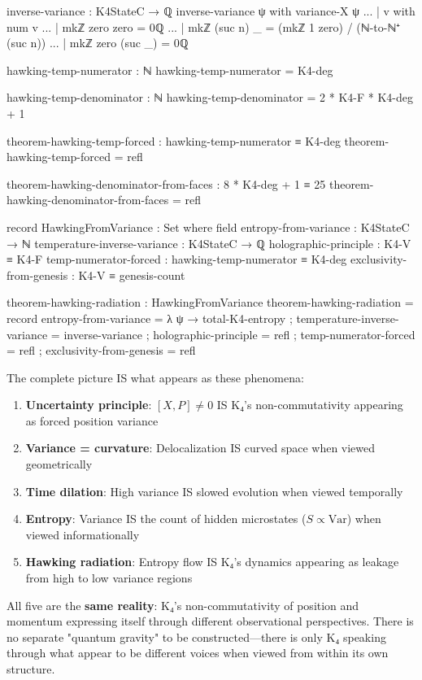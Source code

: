 \documentclass[11pt,a4paper]{book}
\begin{document}
\begin{code}
inverse-variance : K4StateC → ℚ
inverse-variance ψ with variance-X ψ
... | v with num v
...   | mkℤ zero zero = 0ℚ
...   | mkℤ (suc n) _ = (mkℤ 1 zero) / (ℕ-to-ℕ⁺ (suc n))
...   | mkℤ zero (suc _) = 0ℚ

hawking-temp-numerator : ℕ
hawking-temp-numerator = K4-deg

hawking-temp-denominator : ℕ
hawking-temp-denominator = 2 * K4-F * K4-deg + 1

theorem-hawking-temp-forced : hawking-temp-numerator ≡ K4-deg
theorem-hawking-temp-forced = refl

theorem-hawking-denominator-from-faces : 8 * K4-deg + 1 ≡ 25
theorem-hawking-denominator-from-faces = refl

record HawkingFromVariance : Set where
  field
    entropy-from-variance : K4StateC → ℕ
    temperature-inverse-variance : K4StateC → ℚ
    holographic-principle : K4-V ≡ K4-F
    temp-numerator-forced : hawking-temp-numerator ≡ K4-deg
    exclusivity-from-genesis : K4-V ≡ genesis-count

theorem-hawking-radiation : HawkingFromVariance
theorem-hawking-radiation = record
  { entropy-from-variance = λ ψ → total-K4-entropy
  ; temperature-inverse-variance = inverse-variance
  ; holographic-principle = refl
  ; temp-numerator-forced = refl
  ; exclusivity-from-genesis = refl
  }
\end{code}

The complete picture IS what appears as these phenomena:

\begin{enumerate}
\item \textbf{Uncertainty principle}: $[X,P] \neq 0$ IS K₄'s non-commutativity appearing as forced position variance
\item \textbf{Variance = curvature}: Delocalization IS curved space when viewed geometrically
\item \textbf{Time dilation}: High variance IS slowed evolution when viewed temporally
\item \textbf{Entropy}: Variance IS the count of hidden microstates ($S \propto \text{Var}$) when viewed informationally
\item \textbf{Hawking radiation}: Entropy flow IS K₄'s dynamics appearing as leakage from high to low variance regions
\end{enumerate}

All five are the \textbf{same reality}: K₄'s non-commutativity of position and momentum expressing itself through different observational perspectives. There is no separate "quantum gravity" to be constructed—there is only K₄ speaking through what appear to be different voices when viewed from within its own structure.
\end{document}
